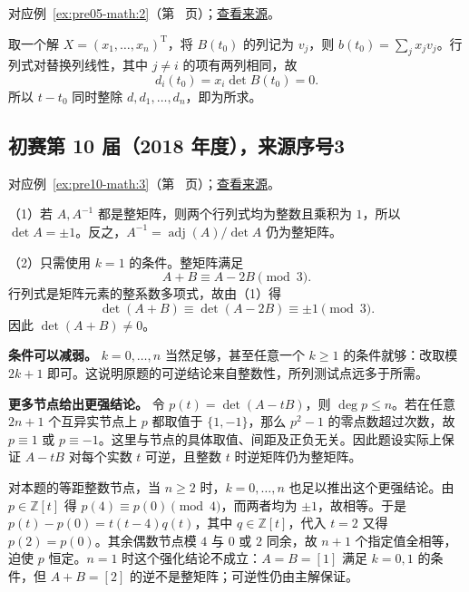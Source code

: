 \documentclass[UTF8,12pt,a4paper,fontset=fandol]{ctexart}
\begin{document}
对应例~\ref{ex:pre05-math:2}（第~\pageref{ex:pre05-math:2} 页）；\href{https://github.com/lzxcr/cmc-mathematics/blob/64916fa1fdbc3e444a652eca204d5669058ee321/src/problems/preliminary/05/02.md}{查看来源}。

\begin{solve}

取一个解 $X=(x_1,\ldots,x_n)^{\mathrm T}$，将 $B(t_0)$ 的列记为 $v_j$，则 $b(t_0)=\sum_jx_jv_j$。行列式对替换列线性，其中 $j\ne i$ 的项有两列相同，故
\[
d_i(t_0)=x_i\det B(t_0)=0.
\]
所以 $t-t_0$ 同时整除 $d,d_1,\ldots,d_n$，即为所求。

\end{solve}

\subsection{初赛第 10 届（2018 年度），来源序号3}\label{ans:pre10-math:3}\label{pr:pre10-math:3}

对应例~\ref{ex:pre10-math:3}（第~\pageref{ex:pre10-math:3} 页）；\href{https://github.com/lzxcr/cmc-mathematics/blob/64916fa1fdbc3e444a652eca204d5669058ee321/src/problems/preliminary/10/03.md}{查看来源}。

\begin{solve}

（1）若 $A,A^{-1}$ 都是整矩阵，则两个行列式均为整数且乘积为 $1$，所以 $\det A=\pm1$。反之，$A^{-1}=\operatorname{adj}(A)/\det A$ 仍为整矩阵。

（2）只需使用 $k=1$ 的条件。整矩阵满足
\[
A+B\equiv A-2B\pmod3.
\]
行列式是矩阵元素的整系数多项式，故由（1）得
\[
\det(A+B)\equiv\det(A-2B)\equiv\pm1\pmod3.
\]
因此 $\det(A+B)\ne0$。

\end{solve}

\begin{remark}[方法与条件]

\textbf{条件可以减弱。} $k=0,\ldots,n$ 当然足够，甚至任意一个 $k\ge1$ 的条件就够：改取模 $2k+1$ 即可。这说明原题的可逆结论来自整数性，所列测试点远多于所需。

\textbf{更多节点给出更强结论。} 令 $p(t)=\det(A-tB)$，则 $\deg p\le n$。若在任意 $2n+1$ 个互异实节点上 $p$ 都取值于 $\{1,-1\}$，那么 $p^2-1$ 的零点数超过次数，故 $p\equiv1$ 或 $p\equiv-1$。这里与节点的具体取值、间距及正负无关。因此题设实际上保证 $A-tB$ 对每个实数 $t$ 可逆，且整数 $t$ 时逆矩阵仍为整矩阵。

对本题的等距整数节点，当 $n\ge2$ 时，$k=0,\ldots,n$ 也足以推出这个更强结论。由 $p\in\mathbb Z[t]$ 得 $p(4)\equiv p(0)\pmod4$，而两者均为 $\pm1$，故相等。于是 $p(t)-p(0)=t(t-4)q(t)$，其中 $q\in\mathbb Z[t]$，代入 $t=2$ 又得 $p(2)=p(0)$。其余偶数节点模 $4$ 与 $0$ 或 $2$ 同余，故 $n+1$ 个指定值全相等，迫使 $p$ 恒定。$n=1$ 时这个强化结论不成立：$A=B=[1]$ 满足 $k=0,1$ 的条件，但 $A+B=[2]$ 的逆不是整矩阵；可逆性仍由主解保证。

\end{remark}
\end{document}

